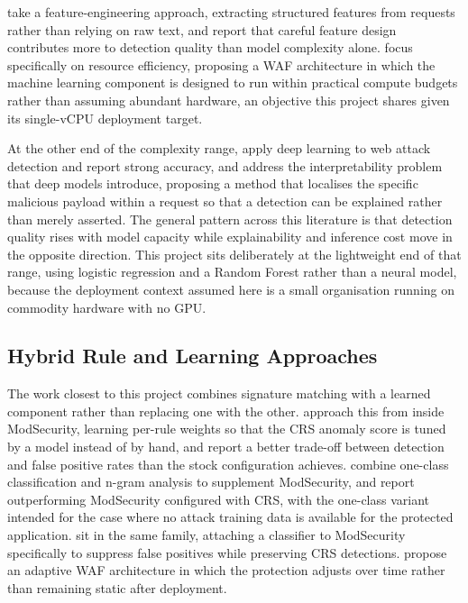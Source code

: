 \documentclass[runningheads]{llncs}
\begin{document}
\citet{shaheed2022} take a feature-engineering approach, extracting
structured features from requests rather than relying on raw text, and
report that careful feature design contributes more to detection
quality than model complexity alone. \citet{domingues2021} focus
specifically on resource efficiency, proposing a WAF architecture in
which the machine learning component is designed to run within
practical compute budgets rather than assuming abundant hardware, an
objective this project shares given its single-vCPU deployment target.

At the other end of the complexity range, \citet{dawadi2023} apply deep
learning to web attack detection and report strong accuracy, and
\citet{li2026} address the interpretability problem that deep models
introduce, proposing a method that localises the specific malicious
payload within a request so that a detection can be explained rather
than merely asserted. The general pattern across this literature is
that detection quality rises with model capacity while explainability
and inference cost move in the opposite direction. This project sits
deliberately at the lightweight end of that range, using logistic
regression and a Random Forest rather than a neural model, because the
deployment context assumed here is a small organisation running on
commodity hardware with no GPU.

\subsection{Hybrid Rule and Learning Approaches}

The work closest to this project combines signature matching with a
learned component rather than replacing one with the other.
\citet{scano2024} approach this from inside ModSecurity, learning
per-rule weights so that the CRS anomaly score is tuned by a model
instead of by hand, and report a better trade-off between detection and
false positive rates than the stock configuration achieves.
\citet{betarte2018} combine one-class classification and n-gram
analysis to supplement ModSecurity, and report outperforming
ModSecurity configured with CRS, with the one-class variant intended
for the case where no attack training data is available for the
protected application. \citet{tran2020} sit in the same family,
attaching a classifier to ModSecurity specifically to suppress false
positives while preserving CRS detections. \citet{calvo2022} propose an
adaptive WAF architecture in which the protection adjusts over time
rather than remaining static after deployment.
\end{document}
